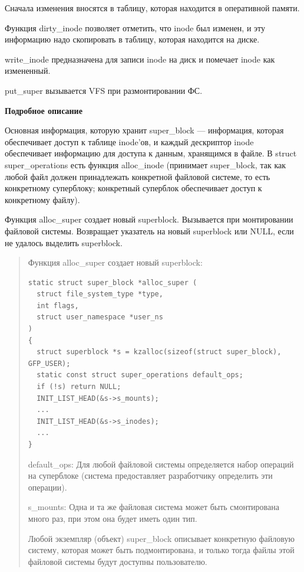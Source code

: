 Сначала изменения вносятся в таблицу, которая находится в оперативной памяти.

Функция dirty\_inode позволяет отметить, что inode был изменен, и эту информацию надо скопировать в таблицу, которая находится на диске.

write\_inode предназначена для записи inode на диск и помечает inode как измененный.

put\_super вызывается VFS при размонтировании ФС.

\textbf{Подробное описание}

Основная информация, которую хранит super\_block — информация, которая обеспечивает доступ к таблице inode'ов, и каждый дескриптор inode обеспечивает информацию для доступа к данным, хранящимся в файле. В struct \\ super\_operations есть функция alloc\_inode (принимает super\_block, так как любой файл должен принадлежать конкретной файловой системе, то есть конкретному суперблоку; конкретный суперблок обеспечивает доступ к конкретному файлу).

Функция alloc\_super создает новый superblock. Вызывается при монтировании файловой системы. Возвращает указатель на новый superblock или NULL, если не удалось выделить superblock.

\begin{quote}

Функция alloc\_super создает новый superblock:

\begin{lstlisting}
static struct super_block *alloc_super (
  struct file_system_type *type,
  int flags,
  struct user_namespace *user_ns
)
{
  struct superblock *s = kzalloc(sizeof(struct super_block), GFP_USER);
  static const struct super_operations default_ops;
  if (!s) return NULL;
  INIT_LIST_HEAD(&s->s_mounts);
  ...
  INIT_LIST_HEAD(&s->s_inodes);
  ...
}
\end{lstlisting}

default\_ops: Для любой файловой системы определяется набор операций на суперблоке (система предоставляет разработчику определить эти операции).

s\_mounts: Одна и та же файловая система может быть смонтирована много раз, при этом она будет иметь один тип.

Любой экземпляр (объект) super\_block описывает конкретную файловую систему, которая может быть подмонтирована, и только тогда файлы этой файловой системы будут доступны пользователю.
\end{quote}

